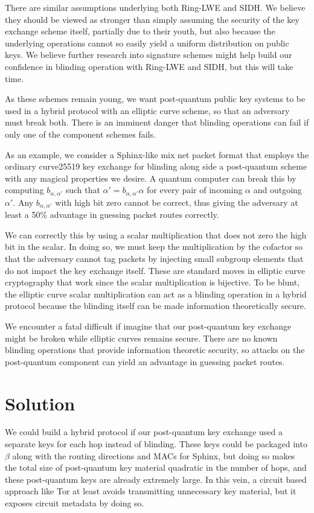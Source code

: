 \documentclass[twoside,letterpaper]{llncs}
\begin{document}
There are similar assumptions underlying both Ring-LWE and SIDH.
We believe they should be viewed as stronger than simply assuming the
security of the key exchange scheme itself, partially due to their
youth, but also because the underlying operations cannot so easily
yield a uniform distribution on public keys.  We believe further
research into signature schemes might help build our confidence in
blinding operation with Ring-LWE and SIDH, but this will take time.

As these schemes remain young, we want post-quantum public key
systems to be used in a hybrid protocol with an elliptic curve scheme,
so that an adversary must break both.  There is an imminent danger
that blinding operations can fail if only one of the component schemes
fails.

As an example, we consider a Sphinx-like mix net packet format that
employs the ordinary curve25519 key exchange for blinding along side
a post-quantum scheme with any magical properties we desire.  
A quantum computer can break this by computing $b_{\alpha,\alpha'}$
such that $\alpha' = b_{\alpha,\alpha'} \alpha$ for every pair of
incoming $\alpha$ and outgoing $\alpha'$.  Any $b_{\alpha,\alpha'}$
with high bit zero cannot be correct, thus giving the adversary at
least a 50\% advantage in guessing packet routes correctly.

We can correctly this by using a scalar multiplication that does not
zero the high bit in the scalar.  In doing so, we must keep the
multiplication by the cofactor so that the adversary cannot tag
packets by injecting small subgroup elements that do not impact the
key exchange itself.  These are standard moves in elliptic curve 
cryptography that work since the scalar multiplication is bijective.
To be blunt, the elliptic curve scalar multiplication can act as
a blinding operation in a hybrid protocol because the blinding itself
can be made information theoretically secure.

We encounter a fatal difficult if imagine that our post-quantum key 
exchange might be broken while elliptic curves remains secure.  
There are no known blinding operations that provide information
theoretic security, so attacks on the post-quantum component can
yield an advantage in guessing packet routes.


\section{Solution}

We could build a hybrid protocol if our post-quantum key exchange
used a separate keys for each hop instead of blinding.  These keys
could be packaged into $\beta$ along with the routing directions and
MACs for Sphinx, but doing so makes the total size of post-quantum 
key material quadratic in the number of hops, and these post-quantum
keys are already extremely large.
In this vein, a circuit based approach like Tor at least avoids
transmitting unnecessary key material, but it exposes circuit
metadata by doing so. 
\end{document}
